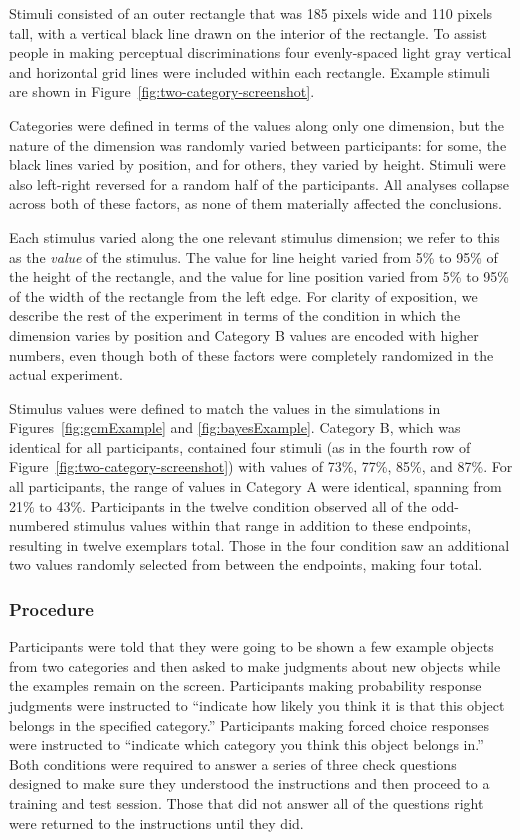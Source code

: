 \documentclass[doc,apacite]{apa6}
\begin{document}
Stimuli consisted of an outer rectangle that was 185 pixels wide and 110 pixels tall, with a vertical black line drawn on the interior of the rectangle. To assist people in making perceptual discriminations four evenly-spaced light gray vertical and horizontal grid lines were included within each rectangle. Example stimuli are shown in Figure~\ref{fig:two-category-screenshot}.

Categories were defined in terms of the values along only one dimension, but the nature of the dimension was randomly varied between participants: for some, the black lines varied by position, and for others, they varied by height. Stimuli were also left-right reversed for a random half of the participants. All analyses collapse across both of these factors, as none of them materially affected the conclusions. 

Each stimulus varied along the one relevant stimulus dimension; we refer to this as the \textit{value} of the stimulus. The value for line height varied from 5\% to 95\% of the height of the rectangle, and the value for line position varied from 5\% to 95\% of the width of the rectangle from the left edge. 
For clarity of exposition, we describe the rest of the experiment in terms of the condition in which the dimension varies by position and Category B values are encoded with higher numbers, even though both of these factors were completely randomized in the actual experiment.

Stimulus values were defined to match the values in the simulations in Figures~\ref{fig:gcmExample} and \ref{fig:bayesExample}. Category B, which was identical for all participants, contained four stimuli (as in the fourth row of Figure~\ref{fig:two-category-screenshot}) with values of 73\%, 77\%, 85\%, and 87\%. For all participants, the range of values in Category A were identical, spanning from 21\% to 43\%. Participants in the {\sc twelve} condition observed all of the odd-numbered stimulus values within that range in addition to these endpoints, resulting in twelve exemplars total. Those in the {\sc four} condition saw an additional two values randomly selected from between the endpoints, making four total.



\subsubsection{Procedure}

Participants were told that they were going to be shown a few example objects from two categories and then asked to make judgments about new objects while the examples remain on the screen. Participants making {\sc probability} response judgments were instructed to ``indicate how likely you think it is that this object belongs in the specified category.'' Participants making {\sc forced choice} responses were instructed to ``indicate which category you think this object belongs in.'' Both conditions were required to answer a series of three check questions designed to make sure they understood the instructions and then proceed to a training and test session. Those that did not answer all of the questions right were returned to the instructions until they did.
\end{document}
